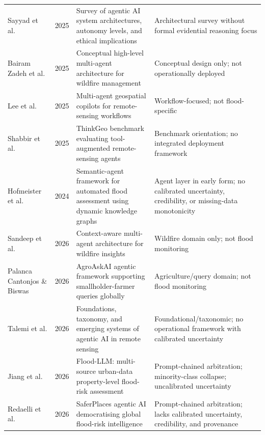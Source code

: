 \begin{table}[htbp]
\begin{tabularx}{\linewidth}{p{2.8cm} c X X}
Sayyad et al. & 2025 & Survey of agentic AI system architectures, autonomy levels, and ethical implications & Architectural survey without formal evidential reasoning focus \\ \addlinespace[0.4em]
Bairam Zadeh et al. & 2025 & Conceptual high-level multi-agent architecture for wildfire management & Conceptual design only; not operationally deployed \\ \addlinespace[0.4em]
Lee et al. & 2025 & Multi-agent geospatial copilots for remote-sensing workflows & Workflow-focused; not flood-specific \\ \addlinespace[0.4em]
Shabbir et al. & 2025 & ThinkGeo benchmark evaluating tool-augmented remote-sensing agents & Benchmark orientation; no integrated deployment framework \\ \addlinespace[0.4em]
Hofmeister et al. & 2024 & Semantic-agent framework for automated flood assessment using dynamic knowledge graphs & Agent layer in early form; no calibrated uncertainty, credibility, or missing-data monotonicity \\ \addlinespace[0.4em]
Sandeep et al. & 2026 & Context-aware multi-agent architecture for wildfire insights & Wildfire domain only; not flood monitoring \\ \addlinespace[0.4em]
Palanca Cantonjos \& Biswas & 2026 & AgroAskAI agentic framework supporting smallholder-farmer queries globally & Agriculture/query domain; not flood monitoring \\ \addlinespace[0.4em]
Talemi et al. & 2026 & Foundations, taxonomy, and emerging systems of agentic AI in remote sensing & Foundational/taxonomic; no operational framework with calibrated uncertainty \\ \addlinespace[0.4em]
Jiang et al. & 2026 & Flood-LLM: multi-source urban-data property-level flood-risk assessment & Prompt-chained arbitration; minority-class collapse; uncalibrated uncertainty \\ \addlinespace[0.4em]
Redaelli et al. & 2026 & SaferPlaces agentic AI democratising global flood-risk intelligence & Prompt-chained arbitration; lacks calibrated uncertainty, credibility, and provenance \\
\bottomrule
\end{tabularx}
\end{table}
